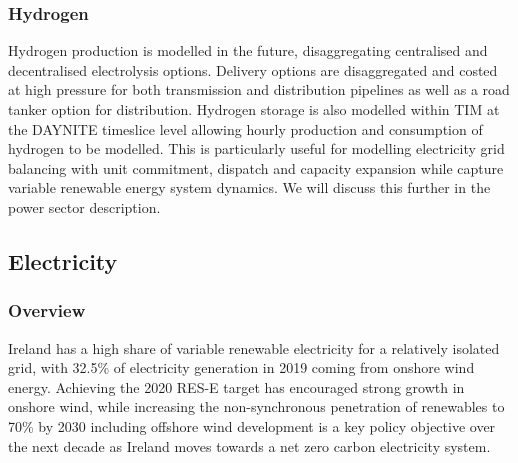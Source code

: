 \documentclass[journal abbreviation, manuscript]{copernicus}
\begin{document}
\subsubsection{Hydrogen}
Hydrogen production is modelled in the future, disaggregating centralised and decentralised electrolysis options. Delivery options are disaggregated and costed at high pressure for both transmission and distribution pipelines as well as a road tanker option for distribution. Hydrogen storage is also modelled within TIM at the DAYNITE timeslice level allowing hourly production and consumption of hydrogen to be modelled. This is particularly useful for modelling electricity grid balancing with unit commitment, dispatch and capacity expansion while capture variable renewable energy system dynamics. We will discuss this further in the power sector description. 

\subsection{Electricity}
\label{ss:power}

\subsubsection{Overview}
Ireland has a high share of variable renewable electricity for a relatively isolated grid, with 32.5\% of electricity generation in 2019 coming from onshore wind energy. Achieving the 2020 RES-E target has encouraged strong growth in onshore wind, while increasing the non-synchronous penetration of renewables to 70\% by 2030 including offshore wind development is a key policy objective over the next decade as Ireland moves towards a net zero carbon electricity system. 
\end{document}
